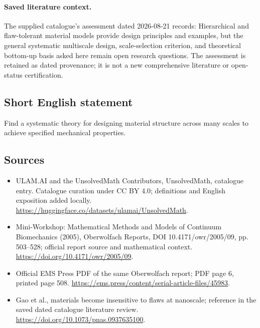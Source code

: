 \documentclass[11pt]{article}
\begin{document}
\paragraph{Saved literature context.} The supplied catalogue's assessment dated 2026-08-21 records: Hierarchical and flaw-tolerant material models provide design principles and examples, but the general systematic multiscale design, scale-selection criterion, and theoretical bottom-up basis asked here remain open research questions. The assessment is retained as dated provenance; it is not a new comprehensive literature or open-status certification.
\subsection{Short English statement}
Find a systematic theory for designing material structure across many scales to achieve specified mechanical properties.
\subsection{Sources}
\begin{itemize}
\item[\hypertarget{source:statement:1}{S1}] ULAM.AI and the UnsolvedMath Contributors, UnsolvedMath, catalogue entry. Catalogue curation under CC BY 4.0; definitions and English exposition added locally.
\url{https://huggingface.co/datasets/ulamai/UnsolvedMath}.
\item[\hypertarget{source:statement:2}{S2}] Mini-Workshop: Mathematical Methods and Models of Continuum Biomechanics (2005), Oberwolfach Reports, DOI 10.4171/owr/2005/09, pp. 503--528; official report source and mathematical context.
\url{https://doi.org/10.4171/owr/2005/09}.
\item[\hypertarget{source:statement:3}{S3}] Official EMS Press PDF of the same Oberwolfach report; PDF page 6, printed page 508.
\url{https://ems.press/content/serial-article-files/45983}.
\item[\hypertarget{source:statement:4}{S4}] Gao et al., materials become insensitive to flaws at nanoscale; reference in the saved dated catalogue literature review.
\url{https://doi.org/10.1073/pnas.0937635100}.
\end{itemize}
\label{end:statement}
\end{document}
